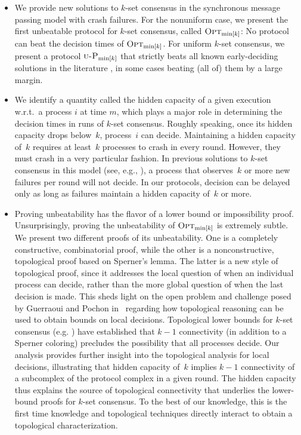 \documentclass[11pt]{article}
\theoremstyle{definition}
\newcommand{\OptMink}{\mbox{$\mbox{\sc Opt}_{\min[k]}$}}
\newcommand{\UOptMink}{\mbox{$\mbox{\sc u-P}_{\min[k]}$}}
\begin{document}
\begin{itemize}
\item We provide new solutions to $k$-set
consensus
in the synchronous message passing model with crash failures. For the nonuniform case, we present the first unbeatable protocol for $k$-set consensus, called $\OptMink$: No protocol can
beat the decision times of
$\OptMink$.
For uniform $k$-set consensus, we present a protocol $\UOptMink$ that strictly
beats
all known early-deciding solutions in the literature \cite{AGGT, CHLT, GGP,GHP, RRT}, in some cases beating (all of) them by a large margin.

\item We identify a quantity called the hidden capacity
of
a given execution
w.r.t.\ a process $i$ at time $m$,
which plays a major role in determining the decision times in runs of $k$-set consensus. Roughly speaking, once its hidden capacity drops below~$k$, process~$i$ can decide. Maintaining a hidden capacity of~$k$ requires at least~$k$ processes to crash in every round. However, they must crash in a very particular fashion. In previous solutions to $k$-set consensus in this model (see, e.g., \cite{GGP}),
a process that observes~$k$ or more new failures per round will not decide. In our protocols,
decision can be delayed only as long as failures maintain a hidden capacity of~$k$ or more.
\item Proving unbeatability has the flavor of a lower bound or impossibility proof.
Unsurprisingly, proving
the unbeatability of $\OptMink$
is extremely subtle. We present two different proofs of its unbeatability. One is a completely constructive, combinatorial proof, while the other is a nonconstructive, topological proof based on Sperner's lemma.
The latter is a new style of topological proof, since it addresses the local question of when an individual process can decide, rather than  the more global question of when the last decision is made.
This sheds light on the open problem and challenge posed by Guerraoui and Pochon in~\cite{GP09} regarding how topological reasoning can be used to obtain bounds on local decisions.
Topological lower bounds for $k$-set consensus (e.g. \cite{CHLT,GHP}) have established that $k-1$ connectivity (in addition to a Sperner coloring) precludes the possibility that all processes decide.
Our analysis provides further insight into the topological analysis for local decisions, illustrating  that hidden capacity of~$k$ implies
$k-1$ connectivity of a subcomplex of the protocol complex in a given round.
 The hidden capacity thus explains the source of topological connectivity that underlies the lower-bound proofs for $k$-set consensus.
 To the best of our knowledge, this is the first time knowledge and topological techniques directly interact to obtain a topological characterization.
\end{itemize}
\end{document}

